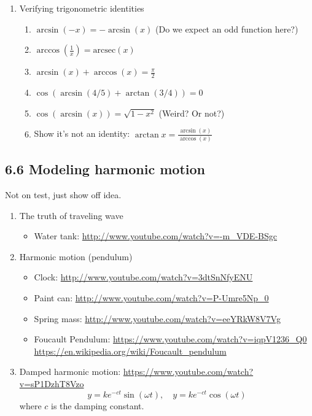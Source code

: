 \documentclass{article}
\newcommand{\ds}{\displaystyle}
\begin{document}
\begin{enumerate}
\item Verifying trigonometric identities
\begin{enumerate}
\item $\arcsin( -x) = -\arcsin(x) $ (Do we expect an odd function here?)
\item $\arccos(\frac{1}{x}) = \text{arcsec}(x)$
\item $\arcsin(x)+\arccos(x) = \frac{\pi}{2}$
\item $\cos(\arcsin(4/5)+\arctan(3/4)) = 0$
\item $\cos(\arcsin(x)) = \sqrt{1-x^2}$ (Weird? Or not?)
\item Show it's not an identity: $\ds \arctan x= \frac{\arcsin(x)}{\arccos(x)}$
\end{enumerate}
\end{enumerate}

\subsection{6.6 Modeling harmonic motion}

Not on test, just show off idea.

\begin{enumerate}

\item The truth of traveling wave 
\begin{itemize}
\item Water tank: \url{http://www.youtube.com/watch?v=-m_VDE-BSgc}
\end{itemize}
\item Harmonic motion (pendulum)
\begin{itemize}
\item Clock: \url{http://www.youtube.com/watch?v=3dtSnNfyENU}
\item Paint can: \url{http://www.youtube.com/watch?v=P-Umre5Np_0}
\item Spring mass: \url{http://www.youtube.com/watch?v=eeYRkW8V7Vg}
\item Foucault Pendulum: \url{https://www.youtube.com/watch?v=iqpV1236_Q0} \url{https://en.wikipedia.org/wiki/Foucault_pendulum}
\end{itemize}

\item Damped harmonic motion: \url{https://www.youtube.com/watch?v=sP1DzhT8Vzo}
\[
y = ke^{-ct}\sin(\omega t), \quad y = ke^{-ct}\cos(\omega t)
\]
where $c$ is the damping constant.
\end{enumerate}
\end{document}
